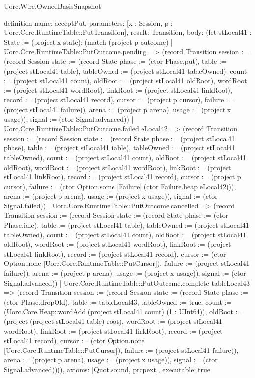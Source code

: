 \begin{lexlean}{Uorc.Wire.OwnedBasisSnapshot}
\begin{semanticmodule}
definition{
  name: acceptPut,
  parameters: [x : Session, p : Uorc.Core.RuntimeTable::PutTransition],
  result: Transition,
  body: (let stLocal41 : State := (project x state); (match (project p outcome)
    | Uorc.Core.RuntimeTable::PutOutcome.pending => (record Transition {session := (record Session {state := (record State {phase := (ctor Phase.put), table := (project stLocal41 table), tableOwned := (project stLocal41 tableOwned), count := (project stLocal41 count), oldRoot := (project stLocal41 oldRoot), wordRoot := (project stLocal41 wordRoot), linkRoot := (project stLocal41 linkRoot), record := (project stLocal41 record), cursor := (project p cursor), failure := (project stLocal41 failure)}), arena := (project p arena), usage := (project x usage)}), signal := (ctor Signal.advanced)})
    | Uorc.Core.RuntimeTable::PutOutcome.failed eLocal42 => (record Transition {session := (record Session {state := (record State {phase := (project stLocal41 phase), table := (project stLocal41 table), tableOwned := (project stLocal41 tableOwned), count := (project stLocal41 count), oldRoot := (project stLocal41 oldRoot), wordRoot := (project stLocal41 wordRoot), linkRoot := (project stLocal41 linkRoot), record := (project stLocal41 record), cursor := (project p cursor), failure := (ctor Option.some [Failure] (ctor Failure.heap eLocal42))}), arena := (project p arena), usage := (project x usage)}), signal := (ctor Signal.failed)})
    | Uorc.Core.RuntimeTable::PutOutcome.cancelled => (record Transition {session := (record Session {state := (record State {phase := (ctor Phase.idle), table := (project stLocal41 table), tableOwned := (project stLocal41 tableOwned), count := (project stLocal41 count), oldRoot := (project stLocal41 oldRoot), wordRoot := (project stLocal41 wordRoot), linkRoot := (project stLocal41 linkRoot), record := (project stLocal41 record), cursor := (ctor Option.none [Uorc.Core.RuntimeTable::PutCursor]), failure := (project stLocal41 failure)}), arena := (project p arena), usage := (project x usage)}), signal := (ctor Signal.advanced)})
    | Uorc.Core.RuntimeTable::PutOutcome.complete tableLocal43 => (record Transition {session := (record Session {state := (record State {phase := (ctor Phase.dropOld), table := tableLocal43, tableOwned := true, count := (Uorc.Core.Heap::wordAdd (project stLocal41 count) (1 : UInt64)), oldRoot := (project (project stLocal41 table) root), wordRoot := (project stLocal41 wordRoot), linkRoot := (project stLocal41 linkRoot), record := (project stLocal41 record), cursor := (ctor Option.none [Uorc.Core.RuntimeTable::PutCursor]), failure := (project stLocal41 failure)}), arena := (project p arena), usage := (project x usage)}), signal := (ctor Signal.advanced)}))),
  axioms: [Quot.sound, propext],
  executable: true
}


\end{semanticmodule}
\end{lexlean}
